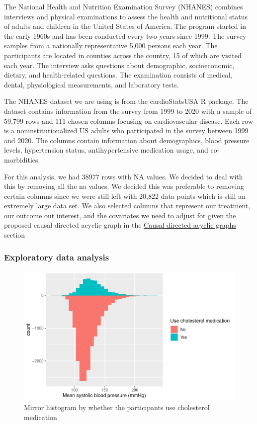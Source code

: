 \documentclass[useAMS,usenatbib,referee]{biom}
\begin{document}
The National Health and Nutrition Examination Survey (NHANES) combines
interviews and physical examinations to assess the health and
nutritional status of adults and children in the United States of
America. The program started in the early 1960s and has been conducted
every two years since 1999. The survey samples from a nationally
representative 5,000 persons each year. The participants are located in
counties across the country, 15 of which are visited each year. The
interview asks questions about demographic, socioeconomic, dietary, and
health-related questions. The examination consists of medical, dental,
physiological measurements, and laboratory tests.

The NHANES dataset we are using is from the cardioStatsUSA R package.
The dataset contains information from the survey from 1999 to 2020 with
a sample of 59,799 rows and 111 chosen columns focusing on
cardiovascular disease. Each row is a noninstitutionalized US adults who
participated in the survey between 1999 and 2020. The columns contain
information about demographics, blood pressure levels, hypertension
status, antihypertensive medication usage, and co-morbidities.

For this analysis, we had 38977 rows with NA values. We decided to deal
with this by removing all the na values. We decided this was preferable
to removing certain columns since we were still left with 20,822 data
points which is still an extremely large data set. We also selected
columns that represent our treatment, our outcome out interest, and the
covariates we need to adjust for given the proposed causal directed
acyclic graph in the \protect\hyperlink{dags}{Causal directed acyclic
graphs} section

\hypertarget{exploratory-data-analysis}{%
\subsubsection{Exploratory data
analysis}\label{exploratory-data-analysis}}

\begin{figure}
\centering
\includegraphics{final-project_files/figure-latex/fig_eda-1.pdf}
\caption{Mirror histogram by whether the participants use cholesterol
medication}
\end{figure}
\end{document}
